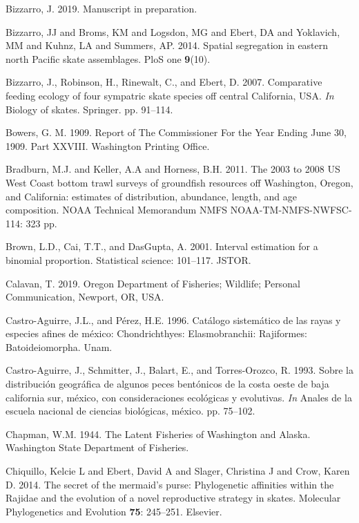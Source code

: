 \documentclass[12pt,]{article}
\begin{document}
\leavevmode\hypertarget{ref-Bizzarro2019}{}%
Bizzarro, J. 2019. Manuscript in preparation.

\leavevmode\hypertarget{ref-Bizzarro2014}{}%
Bizzarro, JJ and Broms, KM and Logsdon, MG and Ebert, DA and Yoklavich,
MM and Kuhnz, LA and Summers, AP. 2014. Spatial segregation in eastern
north Pacific skate assemblages. PloS one \textbf{9}(10).

\leavevmode\hypertarget{ref-Bizzarro2007}{}%
Bizzarro, J., Robinson, H., Rinewalt, C., and Ebert, D. 2007.
Comparative feeding ecology of four sympatric skate species off central
California, USA. \emph{In} Biology of skates. Springer. pp. 91--114.

\leavevmode\hypertarget{ref-Bowers1909}{}%
Bowers, G. M. 1909. Report of The Commissioner For the Year Ending June
30, 1909. Part XXVIII. Washington Printing Office.

\leavevmode\hypertarget{ref-Bradburn2011}{}%
Bradburn, M.J. and Keller, A.A and Horness, B.H. 2011. The 2003 to 2008
US West Coast bottom trawl surveys of groundfish resources off
Washington, Oregon, and California: estimates of distribution,
abundance, length, and age composition. NOAA Technical Memorandum NMFS
NOAA-TM-NMFS-NWFSC-114: 323 pp.

\leavevmode\hypertarget{ref-brown2001interval}{}%
Brown, L.D., Cai, T.T., and DasGupta, A. 2001. Interval estimation for a
binomial proportion. Statistical science: 101--117. JSTOR.

\leavevmode\hypertarget{ref-TedCalavan}{}%
Calavan, T. 2019. Oregon Department of Fisheries; Wildlife; Personal
Communication, Newport, OR, USA.

\leavevmode\hypertarget{ref-Castro1996}{}%
Castro-Aguirre, J.L., and Pérez, H.E. 1996. Catálogo sistemático de las
rayas y especies afines de méxico: Chondrichthyes: Elasmobranchii:
Rajiformes: Batoideiomorpha. Unam.

\leavevmode\hypertarget{ref-Castro1993}{}%
Castro-Aguirre, J., Schmitter, J., Balart, E., and Torres-Orozco, R.
1993. Sobre la distribución geográfica de algunos peces bentónicos de la
costa oeste de baja california sur, méxico, con consideraciones
ecológicas y evolutivas. \emph{In} Anales de la escuela nacional de
ciencias biológicas, méxico. pp. 75--102.

\leavevmode\hypertarget{ref-Chapman1944}{}%
Chapman, W.M. 1944. The Latent Fisheries of Washington and Alaska.
Washington State Department of Fisheries.

\leavevmode\hypertarget{ref-Chiquillo2014}{}%
Chiquillo, Kelcie L and Ebert, David A and Slager, Christina J and Crow,
Karen D. 2014. The secret of the mermaid's purse: Phylogenetic
affinities within the Rajidae and the evolution of a novel reproductive
strategy in skates. Molecular Phylogenetics and Evolution \textbf{75}:
245--251. Elsevier.
\end{document}
